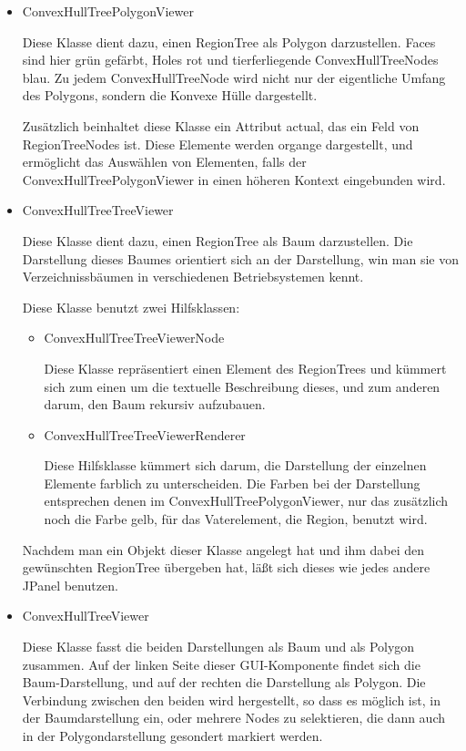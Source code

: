 \begin{itemize}
\item ConvexHullTreePolygonViewer

Diese Klasse dient dazu, einen RegionTree als Polygon darzustellen. Faces sind hier grün gefärbt, Holes rot und tierferliegende ConvexHullTreeNodes blau. Zu jedem ConvexHullTreeNode wird nicht nur der eigentliche Umfang des Polygons, sondern die Konvexe Hülle dargestellt.

Zusätzlich beinhaltet diese Klasse ein Attribut actual, das ein Feld von RegionTreeNodes ist. Diese Elemente werden organge dargestellt, und ermöglicht das Auswählen von Elementen, falls der ConvexHullTreePolygonViewer in einen höheren Kontext eingebunden wird.

\item ConvexHullTreeTreeViewer

Diese Klasse dient dazu, einen RegionTree als Baum darzustellen. Die Darstellung dieses Baumes orientiert sich an der Darstellung, win man sie von Verzeichnissbäumen in verschiedenen Betriebsystemen kennt.

Diese Klasse benutzt zwei Hilfsklassen:
\begin{itemize}
\item ConvexHullTreeTreeViewerNode

Diese Klasse repräsentiert einen Element des RegionTrees und kümmert sich zum einen um die textuelle Beschreibung dieses, und zum anderen darum, den Baum rekursiv aufzubauen.
\item ConvexHullTreeTreeViewerRenderer

Diese Hilfsklasse kümmert sich darum, die Darstellung der einzelnen Elemente farblich zu unterscheiden. Die Farben bei der Darstellung entsprechen denen im ConvexHullTreePolygonViewer, nur das zusätzlich noch die Farbe gelb, für das Vaterelement, die Region, benutzt wird.
\end{itemize}

Nachdem man ein Objekt dieser Klasse angelegt hat und ihm dabei den gewünschten RegionTree übergeben hat, läßt sich dieses wie jedes andere JPanel benutzen.

\item ConvexHullTreeViewer

Diese Klasse fasst die beiden Darstellungen als Baum und als Polygon zusammen. Auf der linken Seite dieser GUI-Komponente findet sich die Baum-Darstellung, und auf der rechten die Darstellung als Polygon. Die Verbindung zwischen den beiden wird hergestellt, so dass es möglich ist, in der Baumdarstellung ein, oder mehrere Nodes zu selektieren, die dann auch in der Polygondarstellung gesondert markiert werden.


\end{itemize}
